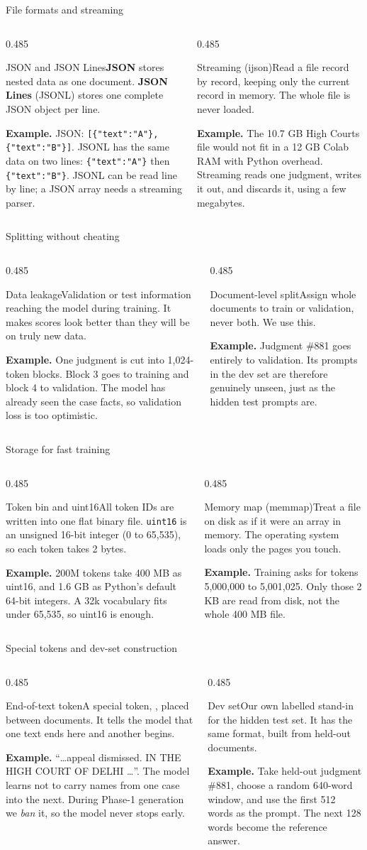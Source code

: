 \documentclass[aspectratio=169,11pt]{beamer}
\newcommand{\code}[1]{\texttt{\small #1}}
\newcommand{\term}[3]{%
  \begin{block}{#1}\small #2\par\vspace{1mm}%
  {\color{exgreen}\textbf{Example.}} #3\end{block}}
\newcommand{\twoterms}[6]{%
  \begin{columns}[T]
    \begin{column}{0.485\textwidth}\term{#1}{#2}{#3}\end{column}
    \begin{column}{0.485\textwidth}\term{#4}{#5}{#6}\end{column}
  \end{columns}}
\begin{document}
\begin{frame}{File formats and streaming}
  \twoterms{JSON and JSON Lines}
  {\textbf{JSON} stores nested data as one document. \textbf{JSON Lines} (JSONL) stores one complete JSON object per line.}
  {JSON: \code{[\{"text":"A"\},\{"text":"B"\}]}. JSONL has the same data on two lines: \code{\{"text":"A"\}} then \code{\{"text":"B"\}}. JSONL can be read line by line; a JSON array needs a streaming parser.}
  {Streaming (ijson)}
  {Read a file record by record, keeping only the current record in memory. The whole file is never loaded.}
  {The 10.7 GB High Courts file would not fit in a 12 GB Colab RAM with Python overhead. Streaming reads one judgment, writes it out, and discards it, using a few megabytes.}
\end{frame}

\begin{frame}{Splitting without cheating}
  \twoterms{Data leakage}
  {Validation or test information reaching the model during training. It makes scores look better than they will be on truly new data.}
  {One judgment is cut into 1,024-token blocks. Block 3 goes to training and block 4 to validation. The model has already seen the case facts, so validation loss is too optimistic.}
  {Document-level split}
  {Assign whole documents to train or validation, never both. We use this.}
  {Judgment \#881 goes entirely to validation. Its prompts in the dev set are therefore genuinely unseen, just as the hidden test prompts are.}
\end{frame}

\begin{frame}{Storage for fast training}
  \twoterms{Token bin and uint16}
  {All token IDs are written into one flat binary file. \code{uint16} is an unsigned 16-bit integer (0 to 65,535), so each token takes 2 bytes.}
  {200M tokens take 400 MB as uint16, and 1.6 GB as Python's default 64-bit integers. A 32k vocabulary fits under 65,535, so uint16 is enough.}
  {Memory map (memmap)}
  {Treat a file on disk as if it were an array in memory. The operating system loads only the pages you touch.}
  {Training asks for tokens 5,000,000 to 5,001,025. Only those 2 KB are read from disk, not the whole 400 MB file.}
\end{frame}

\begin{frame}{Special tokens and dev-set construction}
  \twoterms{End-of-text token}
  {A special token, \code{<|endoftext|>}, placed between documents. It tells the model that one text ends here and another begins.}
  {``\ldots appeal dismissed. \code{<|endoftext|>} IN THE HIGH COURT OF DELHI \ldots''. The model learns not to carry names from one case into the next. During Phase-1 generation we \emph{ban} it, so the model never stops early.}
  {Dev set}
  {Our own labelled stand-in for the hidden test set. It has the same format, built from held-out documents.}
  {Take held-out judgment \#881, choose a random 640-word window, and use the first 512 words as the prompt. The next 128 words become the reference answer.}
\end{frame}
\end{document}
